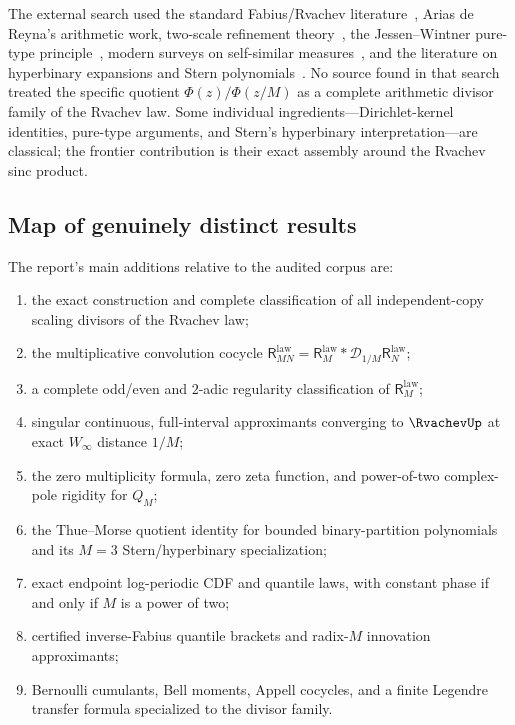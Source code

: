 \documentclass[11pt,oneside]{article}
\theoremstyle{definition}
\theoremstyle{remark}
\newcommand{\D}{\mathcal D}
\newcommand{\ReciprocalIntegerLaw}[1]{\mathsf R^{\mathrm{law}}_{#1}}
\begin{document}
The external search used the standard Fabius/Rvachev literature~\cite{Fabius1966,Arias1982,Arias2018}, Arias de Reyna's arithmetic
work, two-scale refinement theory~\cite{DaubechiesLagariasI,DaubechiesLagariasII}, the Jessen--Wintner pure-type principle~\cite{JessenWintner1935}, modern surveys on
self-similar measures~\cite{Varju2022}, and the literature on hyperbinary expansions and Stern polynomials~\cite{DilcherEricksen2015}.
No source found in that search treated the specific quotient $\Phi(z)/\Phi(z/M)$ as a complete
arithmetic divisor family of the Rvachev law.  Some individual ingredients---Dirichlet-kernel
identities, pure-type arguments, and Stern's hyperbinary interpretation---are classical; the
frontier contribution is their exact assembly around the Rvachev sinc product.

\subsection{Map of genuinely distinct results}

The report's main additions relative to the audited corpus are:
\begin{enumerate}
\item the exact construction and complete classification of all independent-copy scaling
divisors of the Rvachev law;
\item the multiplicative convolution cocycle $\ReciprocalIntegerLaw{MN}=\ReciprocalIntegerLaw{M}*\D_{1/M}\ReciprocalIntegerLaw{N}$;
\item a complete odd/even and $2$-adic regularity classification of $\ReciprocalIntegerLaw{M}$;
\item singular continuous, full-interval approximants converging to $\RvachevUp$ at exact
$W_\infty$ distance $1/M$;
\item the zero multiplicity formula, zero zeta function, and power-of-two complex-pole
rigidity for $Q_M$;
\item the Thue--Morse quotient identity for bounded binary-partition polynomials and its
$M=3$ Stern/hyperbinary specialization;
\item exact endpoint log-periodic CDF and quantile laws, with constant phase if and only if
$M$ is a power of two;
\item certified inverse-Fabius quantile brackets and radix-$M$ innovation approximants;
\item Bernoulli cumulants, Bell moments, Appell cocycles, and a finite Legendre transfer
formula specialized to the divisor family.
\end{enumerate}
\end{document}
